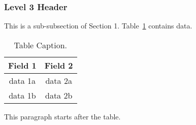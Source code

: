 \documentclass[12pt]{article}
\begin{document}

\subsubsection{Level 3 Header}

This is a sub-subsection of Section 1.  Table~\ref{table1} contains data.

\begin{table}[hbt]
\begin{center}
\begin{tabular}{|c|c|} \hline
Field 1 & Field 2\\ \hline
data 1a   & data 2a\\ \hline
data 1b &  data 2b \\ \hline
\end{tabular}
\end{center}
\caption{Table Caption.}
\label{table1}
\end{table}

This paragraph starts after the table.

\nocite{5207658}
 


\end{document}
